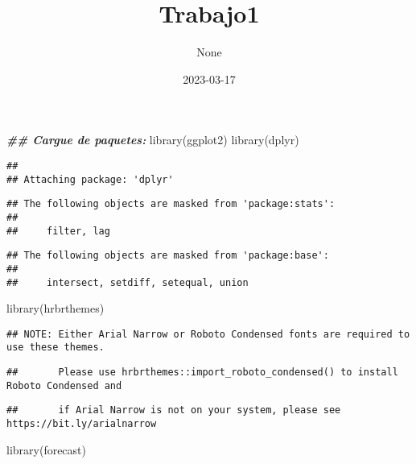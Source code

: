 \documentclass[
]{article}
\title{Trabajo1}
\author{None}
\date{2023-03-17}
\newenvironment{Shaded}{\begin{snugshade}}{\end{snugshade}}
\newcommand{\DocumentationTok}[1]{\textcolor[rgb]{0.56,0.35,0.01}{\textbf{\textit{#1}}}}
\newcommand{\FunctionTok}[1]{\textcolor[rgb]{0.00,0.00,0.00}{#1}}
\newcommand{\NormalTok}[1]{#1}
\begin{document}
\maketitle

\begin{Shaded}
\begin{Highlighting}[]
\DocumentationTok{\#\# Cargue de paquetes:}
\FunctionTok{library}\NormalTok{(ggplot2)}
\FunctionTok{library}\NormalTok{(dplyr)}
\end{Highlighting}
\end{Shaded}

\begin{verbatim}
## 
## Attaching package: 'dplyr'
\end{verbatim}

\begin{verbatim}
## The following objects are masked from 'package:stats':
## 
##     filter, lag
\end{verbatim}

\begin{verbatim}
## The following objects are masked from 'package:base':
## 
##     intersect, setdiff, setequal, union
\end{verbatim}

\begin{Shaded}
\begin{Highlighting}[]
\FunctionTok{library}\NormalTok{(hrbrthemes)}
\end{Highlighting}
\end{Shaded}

\begin{verbatim}
## NOTE: Either Arial Narrow or Roboto Condensed fonts are required to use these themes.
\end{verbatim}

\begin{verbatim}
##       Please use hrbrthemes::import_roboto_condensed() to install Roboto Condensed and
\end{verbatim}

\begin{verbatim}
##       if Arial Narrow is not on your system, please see https://bit.ly/arialnarrow
\end{verbatim}

\begin{Shaded}
\begin{Highlighting}[]
\FunctionTok{library}\NormalTok{(forecast)}
\end{Highlighting}
\end{Shaded}
\end{document}
